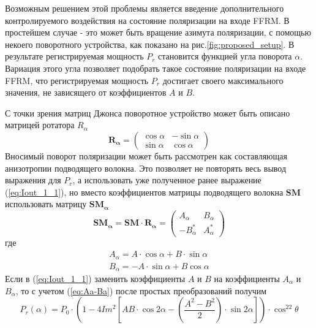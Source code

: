 \documentclass{article}
\begin{document}
Возможным решением этой проблемы является введение дополнительного контролируемого воздействия на состояние поляризации на входе FFRM.
В простейшем случае - это может быть вращение азимута поляризации, с помощью некоего поворотного устройства, как показано на рис.\ref{fig:proposed_setup}.
В результате регистрируемая мощность $P_r$ становится функцией угла поворота $\alpha$.
Вариация этого угла позволяет подобрать такое состояние поляризации на входе FFRM, что регистрируемая мощность $P_r$ достигает своего максимального значения, не зависящего от коэффициентов $A$ и $B$.

С точки зрения матриц Джонса поворотное устройство может быть описано матрицей ротатора $R_\alpha$
\begin{equation}
	\label{eq:rotMatrix}
	\bm{R_\alpha} = 
	\begin{pmatrix}
		\cos\alpha & -\sin\alpha \\
		\sin\alpha & \cos\alpha
	\end{pmatrix}	
\end{equation} 
Вносимый поворот поляризации может быть рассмотрен как составляющая анизотропии подводящего волокна.
Это позволяет не повторять весь вывод выражения для $P_r$, а использовать уже полученное ранее выражение (\ref{eq:Iout_1_1}), но вместо коэффициентов матрицы подводящего волокна $\bm{SM}$ использовать матрицу $\bm{SM_\alpha}$    
\begin{equation}
	\bm{SM_\alpha} = \bm{SM}\cdot\bm{R_\alpha}= 
	\begin{pmatrix}
		A_\alpha & B_\alpha \\
		-B^*_\alpha & A^*_\alpha
	\end{pmatrix}	
\end{equation}
где
\begin{equation}
   \label{eq:Aa-Ba}
    \begin{aligned}
        A_\alpha = A\cdot\cos\alpha+B\cdot\sin\alpha \\
        B_\alpha = -A\cdot\sin\alpha+B\cos\alpha
    \end{aligned}
\end{equation}
Если в (\ref{eq:Iout_1_1}) заменить коэффициенты $A$ и $B$ на коэффициенты $A_\alpha$ и $B_\alpha$, то с учетом (\ref{eq:Aa-Ba}) после простых преобразований получим
\begin{equation}
    \label{eq:Pr_our}
    P_r(\alpha)=P_0\cdot\left( 1-4Im^2\left[A B\cdot \cos2\alpha -\left( \frac{A^2-B^2}{2} \right)\cdot\sin2\alpha\right] \right)\cdot\cos^22\theta
\end{equation}
\end{document}
